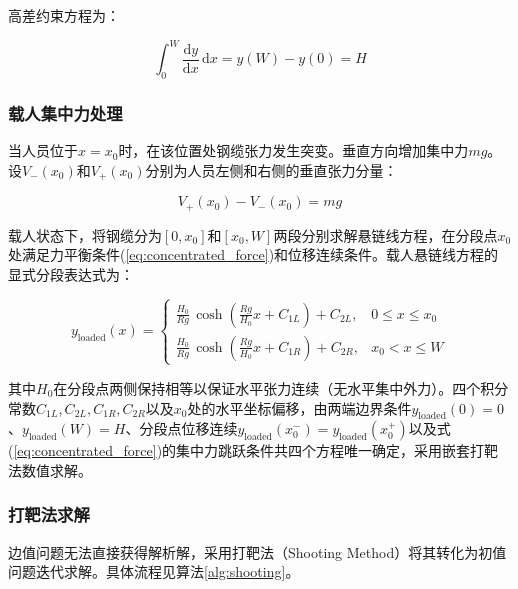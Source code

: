 \documentclass[12pt,a4paper]{ctexart}
\begin{document}
高差约束方程为：

\begin{equation}
  \int_{0}^{W} \frac{\mathrm{d}y}{\mathrm{d}x}\,\mathrm{d}x = y(W) - y(0) = H
  \label{eq:height_diff}
\end{equation}

\subsubsection{载人集中力处理}

当人员位于$x = x_0$时，在该位置处钢缆张力发生突变。垂直方向增加集中力$mg$。设$V_-(x_0)$和$V_+(x_0)$分别为人员左侧和右侧的垂直张力分量：

\begin{equation}
  V_+(x_0) - V_-(x_0) = mg
  \label{eq:concentrated_force}
\end{equation}

载人状态下，将钢缆分为$[0, x_0]$和$[x_0, W]$两段分别求解悬链线方程，在分段点$x_0$处满足力平衡条件(\ref{eq:concentrated_force})和位移连续条件。载人悬链线方程的显式分段表达式为：

\begin{equation}
  y_{\text{loaded}}(x) =
  \begin{cases}
    \displaystyle \frac{H_0}{Rg}\,\cosh\!\left(\frac{Rg}{H_0}x + C_{1L}\right) + C_{2L}, & 0 \leq x \leq x_0 \\[12pt]
    \displaystyle \frac{H_0}{Rg}\,\cosh\!\left(\frac{Rg}{H_0}x + C_{1R}\right) + C_{2R}, & x_0 < x \leq W
  \end{cases}
  \label{eq:loaded_catenary}
\end{equation}

其中$H_0$在分段点两侧保持相等以保证水平张力连续（无水平集中外力）。四个积分常数$C_{1L}, C_{2L}, C_{1R}, C_{2R}$以及$x_0$处的水平坐标偏移，由两端边界条件$y_{\text{loaded}}(0)=0$、$y_{\text{loaded}}(W)=H$、分段点位移连续$y_{\text{loaded}}(x_0^-)=y_{\text{loaded}}(x_0^+)$以及式(\ref{eq:concentrated_force})的集中力跳跃条件共四个方程唯一确定，采用嵌套打靶法数值求解。

\subsubsection{打靶法求解}

边值问题无法直接获得解析解，采用打靶法（Shooting Method）将其转化为初值问题迭代求解。具体流程见算法\ref{alg:shooting}。
\end{document}

